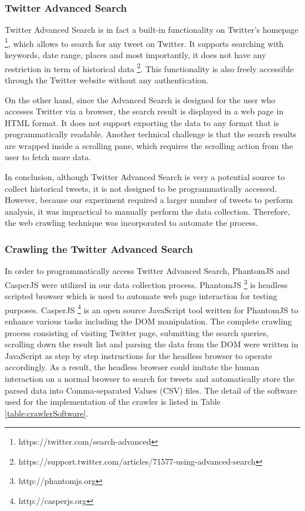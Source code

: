 \subsubsection{Twitter Advanced Search}
Twitter Advanced Search is in fact a built-in functionality on Twitter's homepage \footnote{https://twitter.com/search-advanced}, which allows to search for any tweet on Twitter. It supports searching with keywords, date range, places and most importantly, it does not have any restriction in term of historical data \footnote{https://support.twitter.com/articles/71577-using-advanced-search}. This functionality is also freely accessible through the Twitter website without any authentication.

On the other hand, since the Advanced Search is designed for the user who accesses Twitter via a browser, the search result is displayed in a web page in HTML format. It does not support exporting the data to any format that is programmatically readable. Another technical challenge is that the search results are wrapped inside a scrolling pane, which requires the scrolling action from the user to fetch more data. 

In conclusion, although Twitter Advanced Search is very a potential source to collect historical tweets, it is not designed to be programmatically accessed. However, because our experiment required a larger number of tweets to perform analysis, it was impractical to manually perform the data collection. Therefore, the web crawling technique was incorporated to automate the process.

\subsubsection{Crawling the Twitter Advanced Search}
In order to programmatically access Twitter Advanced Search, PhantomJS and CasperJS were utilized in our data collection process. PhantomJS \footnote{http://phantomjs.org} is headless scripted browser which is used to automate web page interaction for testing purposes. CasperJS \footnote{http://casperjs.org} is an open source JavaScript tool written for PhantomJS to enhance various tasks including the DOM manipulation. The complete crawling process consisting of visiting Twitter page, submitting the search queries, scrolling down the result list and parsing the data from the DOM were written in JavaScript as step by step instructions for the headless browser to operate accordingly. As a result, the headless browser could imitate the human interaction on a normal browser to search for tweets and automatically store the parsed data into Comma-separated Values (CSV) files. The detail of the software used for the implementation of the crawler is listed in Table \ref{table:crawlerSoftware}.

